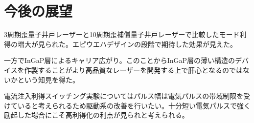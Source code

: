 \section{今後の展望}
3周期歪量子井戸レーザーと10周期歪補償量子井戸レーザーで比較したモード利得の増大が見られた。エピウエハデザインの段階で期待した効果が見えた。

一方でInGaP層によるキャリア広がり。このことからInGaP層の薄い構造のデバイスを作製することがより高品質なレーザーを開発する上で肝心となるのではないかという知見を得た。


電流注入利得スイッチング実験についてはパルス幅は電気パルスの帯域制限を受けていると考えられるため駆動系の改善を行いたい。十分短い電気パルスで強く励起した場合にこそ高利得化の利点が見られと考えられる。